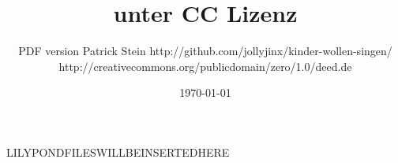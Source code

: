 \documentclass[10pt]{article}
\title{ unter CC Lizenz}
\author{ PDF version Patrick Stein http://github.com/jollyjinx/kinder-wollen-singen/  \\ http://creativecommons.org/publicdomain/zero/1.0/deed.de }
\date{\today}
\begin{document}
\maketitle

\begin{adjustwidth}{2cm}{2cm}
\tableofcontents
\end{adjustwidth}

\pagebreak

LILYPONDFILESWILLBEINSERTEDHERE
\end{document}
